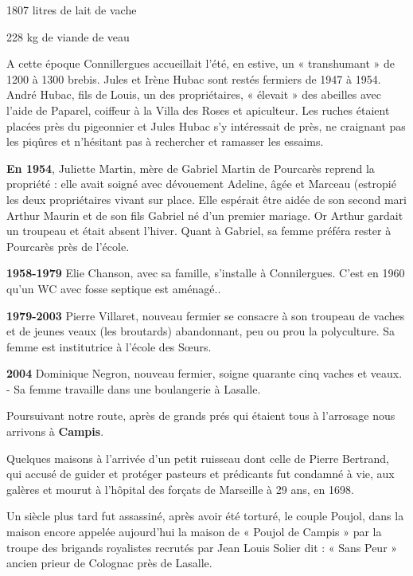 \hspace{3.5cm} 1807 litres de lait de vache

\hspace{3.5cm} 228 kg de viande de veau

A cette époque Connillergues accueillait l’été, en estive, un « transhumant » de 1200 à 1300
brebis. Jules et Irène Hubac sont restés fermiers de 1947 à 1954.
André Hubac, fils de Louis, un des propriétaires, « élevait » des abeilles avec l’aide de
Paparel, coiffeur à la Villa des Roses et apiculteur. Les ruches étaient placées près du
pigeonnier et Jules Hubac s’y intéressait de près, ne craignant pas les piqûres et n’hésitant pas
à rechercher et ramasser les essaims.


\textbf{En 1954}, Juliette Martin, mère de Gabriel Martin de Pourcarès reprend la propriété : elle avait
soigné avec dévouement Adeline, âgée et Marceau (estropié les deux propriétaires vivant sur
place. Elle espérait être aidée de son second mari Arthur Maurin et de son fils Gabriel né
d’un premier mariage. Or Arthur gardait un troupeau et était absent l’hiver. Quant à Gabriel,
sa femme préféra rester à Pourcarès près de l’école.

\textbf{1958-1979} \hspace{0.3cm} Elie Chanson, avec sa famille, s’installe à Connilergues. C’est en 1960 qu’un
WC avec fosse septique est aménagé..

\textbf{1979-2003} \hspace{0.3cm} Pierre Villaret, nouveau fermier se consacre à son troupeau de vaches et de
jeunes veaux (les broutards) abandonnant, peu ou prou la polyculture.
Sa femme est institutrice à l’école des Sœurs.

\textbf{2004} \hspace{1.25cm} Dominique Negron, nouveau fermier, soigne quarante cinq vaches et veaux. -
Sa femme travaille dans une boulangerie à Lasalle.

\vspace{0.4cm}

Poursuivant notre route, après de grands prés qui étaient tous à l’arrosage nous arrivons à
\textbf{Campis}.

Quelques maisons à l’arrivée d’un petit ruisseau dont celle de Pierre Bertrand, qui accusé de
guider et protéger pasteurs et prédicants fut condamné à vie, aux galères et mourut à l’hôpital
des forçats de Marseille à 29 ans, en 1698.

Un siècle plus tard fut assassiné, après avoir été torturé, le couple Poujol, dans la maison
encore appelée aujourd’hui la maison de « Poujol de Campis » par la troupe des brigands
royalistes recrutés par Jean Louis Solier dit : « Sans Peur » ancien prieur de Colognac près de
Lasalle.

